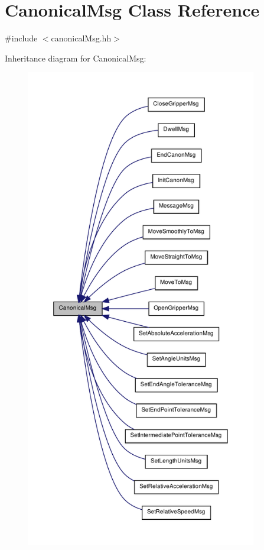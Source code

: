 \hypertarget{class_canonical_msg}{
\section{CanonicalMsg Class Reference}
\label{class_canonical_msg}
}


{\ttfamily \#include $<$canonicalMsg.hh$>$}



Inheritance diagram for CanonicalMsg:\nopagebreak
\begin{figure}[H]
\begin{center}
\leavevmode
\includegraphics[height=600pt]{class_canonical_msg__inherit__graph}
\end{center}
\end{figure}


